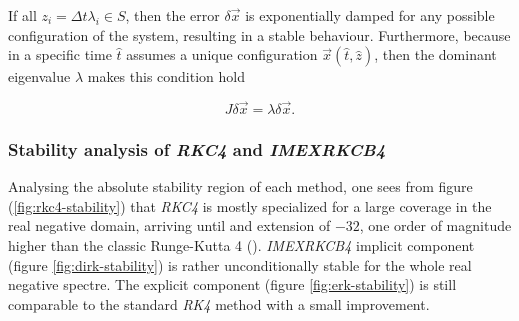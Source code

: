 \documentclass[final]{jpp}
\begin{document}
If all $z_i = \Delta t \lambda_i \in S$, then the error $\delta \vec{x}$ is exponentially damped for any possible configuration of the system, resulting in a stable behaviour. 
Furthermore, because in a specific time $\hat{t}$ assumes a unique configuration $\vec{x}(\hat{t}, \hat{z})$, then the dominant eigenvalue $\lambda$ makes this condition hold

\begin{equation} \label{eq:eig_current}
J \delta \vec{x} = \lambda \delta \vec{x}.
\end{equation}

\subsubsection{Stability analysis of \textit{RKC4} and \textit{IMEXRKCB4}}
Analysing the absolute stability region of each method, one sees from figure (\ref{fig:rkc4-stability}) that \textit{RKC4} is mostly specialized for a large coverage in the real negative domain, arriving until and extension of $-32$, one order of magnitude higher than the classic Runge-Kutta 4 (\cite{doerk}). \textit{IMEXRKCB4} implicit component (figure \ref{fig:dirk-stability}) is rather unconditionally stable for the whole real negative spectre. The explicit component (figure \ref{fig:erk-stability}) is still comparable to the standard \textit{RK4} method with a small improvement.
\end{document}
